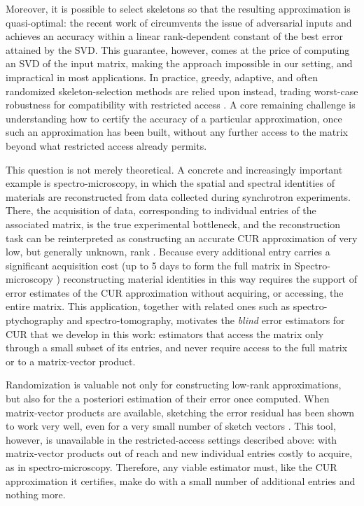 \documentclass[11pt]{article}
\begin{document}
 Moreover, it is possible to select skeletons so that the resulting approximation is quasi-optimal: the recent work of \cite{Osinsky2025} circumvents the issue of adversarial inputs and achieves an accuracy within a linear rank-dependent constant of the best error attained by the SVD.
This guarantee, however, comes at the price of computing an SVD of the input matrix, making the approach impossible in our setting, and impractical in most applications. In practice, greedy, adaptive, and often randomized skeleton-selection methods are relied upon instead, trading worst-case robustness for compatibility with restricted access \cite{CortinovisKressner2026, Deshpande2010, Drineas2006, Drmac2016, Frieze2004, Goreinov1997, DrineasMahoney2009, Osinsky2025, DongChenMartPearce2025, Pritchard2025, Sorensen2016, Stewart1999}.
A core remaining challenge is understanding how to certify the accuracy of a particular approximation, once such an approximation has been built, without any further access to the matrix beyond what restricted access already permits.

This question is not merely theoretical. A concrete and increasingly important example is spectro-microscopy, in which the spatial and spectral identities of materials are reconstructed from data collected during synchrotron experiments.
There, the acquisition of data, corresponding to individual entries of the associated matrix, is the true experimental bottleneck, and the reconstruction task can be reinterpreted as constructing an accurate CUR approximation of very low, but generally unknown, rank \cite{meier2026reducingacquisitiontimeradiation}.
Because every additional entry carries a significant acquisition cost (up to 5 days to form the full matrix in Spectro-microscopy \cite{hirose2019oxygendiffusiondriven}) reconstructing material identities in this way requires the support of error estimates of the CUR approximation without acquiring, or accessing, the entire matrix.
This application, together with related ones such as spectro-ptychography and spectro-tomography, motivates the \emph{blind} error estimators for CUR that we develop in this work: estimators that access the matrix only through a small subset of its entries, and never require access to the full matrix or to a matrix-vector product.

Randomization is valuable not only for constructing low-rank approximations, but also for the a posteriori estimation of their error once computed.
When matrix-vector products are available, sketching the error residual has been shown to work very well, even for a very small number of sketch vectors \cite[Sect. 12]{martinssonRandomizedNumericalLinear2020a}.
This tool, however, is unavailable in the restricted-access settings described above: with matrix-vector products out of reach and new individual entries costly to acquire, as in spectro-microscopy. Therefore, any viable estimator must, like the CUR approximation it certifies, make do with a small number of additional entries and nothing more.
\end{document}
